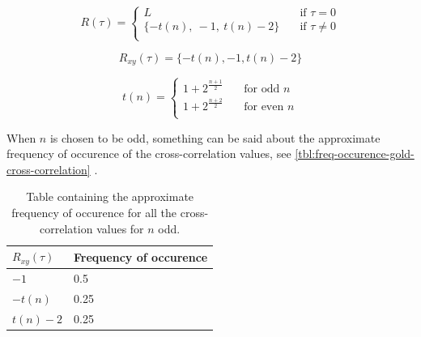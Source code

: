 		\begin{equation}
			\label{eq:autocorr-gold}
			R(\tau) = 
				\begin{cases}
					L    							& \quad \text{if } \tau = 0 \\
					\{ -t(n), \ -1, \ t(n) - 2  \} 	& \quad \text{if } \tau \neq 0 \\
				\end{cases}
		\end{equation}

		\begin{equation}
			\label{eq:corsscorr-gold}
			R_{xy}(\tau) = 	\{ -t(n), -1, t(n) - 2  \} 
		\end{equation}

		\begin{equation}
			\label{eq:gold-t(n)}
			t(n) = 
				\begin{cases}
					1 + 2^{\frac{n+1}{2}} & \quad \text{for odd } n \\
					1 + 2^{\frac{n+2}{2}} & \quad \text{for even } n \\
				\end{cases}
		\end{equation}

		When $n$ is chosen to be odd, something can be said about the approximate frequency of occurence of the cross-correlation values, see \autoref{tbl:freq-occurence-gold-cross-correlation} \cite{holmes2007spread}.

		\begin{table}[h]
			\centering
			\begin{tabular}{ | l | l | }

				\hline
				$R_{xy}(\tau)$ 	& Frequency of occurence	\\ \hline

				$-1$			& 0.5					 	\\ \hline
				$-t(n)$			& 0.25						\\ \hline
				$t(n) - 2$		& 0.25						\\ \hline

				

			\end{tabular}
			\caption{Table containing the approximate frequency of occurence for all the cross-correlation values for $n$ odd.}
			\label{tbl:freq-occurence-gold-cross-correlation}
		\end{table}

		



